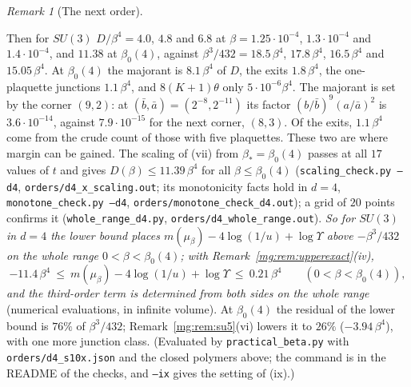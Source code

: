 \documentclass[11pt,a4paper]{article}
\theoremstyle{definition}
\theoremstyle{remark}
\newtheorem{remark}[theorem]{Remark}
\begin{document}
\begin{remark}[The next order]
\begin{itemize}
\end{itemize}
Then for $SU(3)$ $D/\beta^4=4.0$, $4.8$ and $6.8$ at $\beta=1.25\cdot10^{-4}$, $1.3\cdot10^{-4}$ and $1.4\cdot10^{-4}$, and $11.38$ at $\beta_0(4)$, against $\beta^3/432=18.5\,\beta^4$, $17.8\,\beta^4$,
$16.5\,\beta^4$ and $15.05\,\beta^4$. At $\beta_0(4)$ the majorant is $8.1\,\beta^4$ of $D$, the exits $1.8\,\beta^4$, the one-plaquette junctions $1.1\,\beta^4$, and $8(K+1)\theta$ only $5\cdot10^{-6}\beta^4$. The majorant is set by the
corner $(9,2)$: at $(\bar b,\bar a)=(2^{-8},2^{-11})$ its factor $(b/\bar b)^9(a/\bar a)^2$ is $3.6\cdot10^{-14}$, against $7.9\cdot10^{-15}$ for the next corner, $(8,3)$. Of the exits, $1.1\,\beta^4$
come from the crude count of those with five plaquettes. These two are where margin can be gained. The scaling of (vii) from
$\beta_*=\beta_0(4)$ passes at all $17$ values of $t$ and gives $D(\beta)\le11.39\,\beta^4$ for all $\beta\le\beta_0(4)$ (\texttt{scaling\_check.py --d4}, \texttt{orders/d4\_x\_scaling.out}; its
monotonicity facts hold in $d=4$, \texttt{monotone\_check.py --d4}, \texttt{orders/monotone\_check\_d4.out}); a grid of $20$ points confirms it (\texttt{whole\_range\_d4.py},
\texttt{orders/d4\_whole\_range.out}). \emph{So for $SU(3)$ in $d=4$ the lower bound places $m(\mu_\beta)-4\log(1/u)+\log\Upsilon$
above $-\beta^3/432$ on the whole range $0<\beta<\beta_0(4)$; with Remark~\ref{mg:rem:upperexact}(iv),
\[
-11.4\,\beta^4\ \le\ m(\mu_\beta)-4\log(1/u)+\log\Upsilon\ \le\ 0.21\,\beta^4\qquad(0<\beta<\beta_0(4)),
\]
and the third-order term is determined from both sides on the whole range} (numerical evaluations, in infinite volume). At $\beta_0(4)$ the residual of the lower bound is $76\%$ of
$\beta^3/432$; Remark~\ref{mg:rem:su5}(vi) lowers it to $26\%$ ($-3.94\,\beta^4$), with one more junction class. (Evaluated by \texttt{practical\_beta.py} with \texttt{orders/d4\_s10x.json} and the closed polymers above; the command is in the README of the checks, and
\texttt{--ix} gives the setting of (ix).)


\end{remark}
\end{document}
